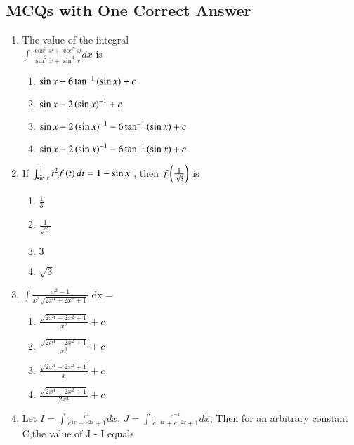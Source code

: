 \documentclass[article,12pt,onecolumn]{IEEEtran}
\theoremstyle{remark}
\begin{document}
\subsection{MCQs with One Correct Answer}
\begin{enumerate}
\item The value of the integral \\ $ \int\frac{\cos^{3}x + \cos^{5}x}{\sin^{2}x + \sin^{4}x} dx$ is
\hfill {}
\begin{enumerate}
    \item $\sin x - 6\tan^{-1}\left(\sin x\right)+ c$
    \item $\sin x - 2 \left(\sin x\right)^{-1} + c$
    \item $\sin x - 2 \left(\sin x\right)^{-1} - 6 \tan^{-1}\left(\sin x\right) + c$ 
    \item $\sin x - 2 \left(\sin x\right)^{-1} - 6 \tan^{-1}\left(\sin x\right) + c$
\end{enumerate}
\item If $\int_{\sin x}^{1}t^2 
 f\left(t\right)dt = 1- \sin x $ , then $f\left(\frac{1}{\sqrt{3}}\right)$ is 
 \hfill {}
\begin{multicols}{2}
\begin{enumerate}
    \item $\frac{1}{3}$
    \item $\frac{1}{\sqrt{3}}$
    \item $3$ 
    \item $\sqrt{3}$
\end{enumerate}
\end{multicols}
\item $\int\frac{x^{2} - 1}{x^{3}\sqrt{2x^{4}+2x^{2}+1}}$ dx = 
\hfill {}
\begin{enumerate}
    \item $\frac{\sqrt{2x^{4}-2x^{2}+1}}{x^{2}} + c$
    \item $\frac{\sqrt{2x^{4}-2x^{2}+1}}{x^{3}} +c$
    \item $\frac{\sqrt{2x^{4}-2x^{2}+1}}{x} +c$ 
    \item $\frac{\sqrt{2x^{4}-2x^{2}+1}}{2x^{2}} +c$
\end{enumerate}
\item Let $I=\int\frac{e^{x}}{e^{4x}+e^{2x} +1}dx$, 
$J=\int\frac{e^{-x}}{e^{-4x}+e^{-2x} +1}dx$, Then for an arbitrary constant C,the value of J - I equals 


\end{enumerate}
\end{document}
